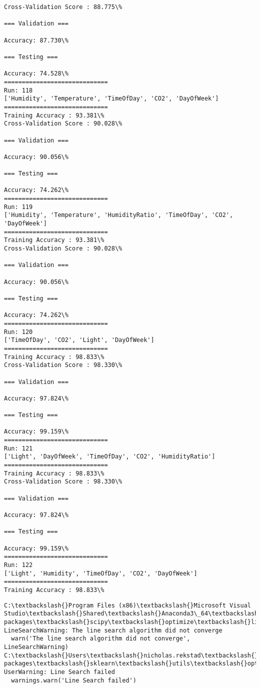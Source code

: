 \documentclass[11pt]{article}
\begin{document}
    \begin{Verbatim}[commandchars=\\\{\}]
Cross-Validation Score : 88.775\%

=== Validation ===

Accuracy: 87.730\%

=== Testing ===

Accuracy: 74.528\%
=============================
Run: 118
['Humidity', 'Temperature', 'TimeOfDay', 'CO2', 'DayOfWeek']
=============================
Training Accuracy : 93.381\%
Cross-Validation Score : 90.028\%

=== Validation ===

Accuracy: 90.056\%

=== Testing ===

Accuracy: 74.262\%
=============================
Run: 119
['Humidity', 'Temperature', 'HumidityRatio', 'TimeOfDay', 'CO2', 'DayOfWeek']
=============================
Training Accuracy : 93.381\%
Cross-Validation Score : 90.028\%

=== Validation ===

Accuracy: 90.056\%

=== Testing ===

Accuracy: 74.262\%
=============================
Run: 120
['TimeOfDay', 'CO2', 'Light', 'DayOfWeek']
=============================
Training Accuracy : 98.833\%
Cross-Validation Score : 98.330\%

=== Validation ===

Accuracy: 97.824\%

=== Testing ===

Accuracy: 99.159\%
=============================
Run: 121
['Light', 'DayOfWeek', 'TimeOfDay', 'CO2', 'HumidityRatio']
=============================
Training Accuracy : 98.833\%
Cross-Validation Score : 98.330\%

=== Validation ===

Accuracy: 97.824\%

=== Testing ===

Accuracy: 99.159\%
=============================
Run: 122
['Light', 'Humidity', 'TimeOfDay', 'CO2', 'DayOfWeek']
=============================
Training Accuracy : 98.833\%

    \end{Verbatim}

    \begin{Verbatim}[commandchars=\\\{\}]
C:\textbackslash{}Program Files (x86)\textbackslash{}Microsoft Visual Studio\textbackslash{}Shared\textbackslash{}Anaconda3\_64\textbackslash{}lib\textbackslash{}site-packages\textbackslash{}scipy\textbackslash{}optimize\textbackslash{}linesearch.py:313: LineSearchWarning: The line search algorithm did not converge
  warn('The line search algorithm did not converge', LineSearchWarning)
C:\textbackslash{}Users\textbackslash{}nicholas.rekstad\textbackslash{}AppData\textbackslash{}Roaming\textbackslash{}Python\textbackslash{}Python36\textbackslash{}site-packages\textbackslash{}sklearn\textbackslash{}utils\textbackslash{}optimize.py:195: UserWarning: Line Search failed
  warnings.warn('Line Search failed')

    \end{Verbatim}
\end{document}
